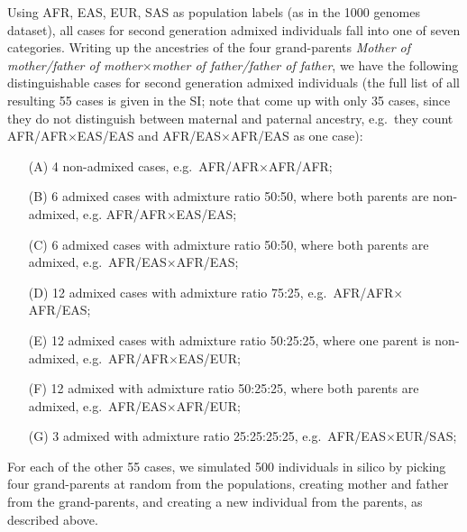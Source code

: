 \documentclass[12pt]{article}
\theoremstyle{definition}
\begin{document}
Using AFR, EAS, EUR, SAS as population labels (as in the 1000 genomes
dataset), all cases for second generation admixed individuals fall
into one of seven categories. Writing up the ancestries of the four
grand-parents {\it Mother of mother/father of mother$\times$mother of
  father/father of father}, we have the following distinguishable
cases for second generation admixed individuals (the full list of all
resulting 55 cases is given in the SI; note that \cite{Cheung2018}
come up with only 35 cases, since they do not distinguish between
maternal and paternal ancestry, e.g.\ they count
AFR/AFR$\times$EAS/EAS and AFR/EAS$\times$AFR/EAS as one case):

\begin{itemize}
\item[(A)] 4 non-admixed cases, e.g.\ AFR/AFR$\times$AFR/AFR;
\item[(B)] 6 admixed cases with admixture ratio 50:50, where both
  parents are non-admixed, e.g. AFR/AFR$\times$EAS/EAS;
\item[(C)] 6 admixed cases with admixture ratio 50:50, where both
  parents are admixed, e.g.\ AFR/EAS$\times$AFR/EAS;
\item[(D)] 12 admixed cases with admixture ratio 75:25, e.g.\
  AFR/AFR$\times$AFR/EAS;
\item[(E)] 12 admixed cases with admixture ratio 50:25:25, where one
  parent is non-admixed, e.g.\ AFR/AFR$\times$EAS/EUR;
\item[(F)] 12 admixed with admixture ratio 50:25:25, where both
  parents are admixed, e.g.\ AFR/EAS$\times$AFR/EUR;
\item[(G)] 3 admixed with admixture ratio 25:25:25:25, e.g.\
  AFR/EAS$\times$EUR/SAS;
\end{itemize}
For each of the other 55 cases, we simulated 500 individuals in silico
by picking four grand-parents at random from the populations, creating
mother and father from the grand-parents, and creating a new
individual from the parents, as described above.
\end{document}
